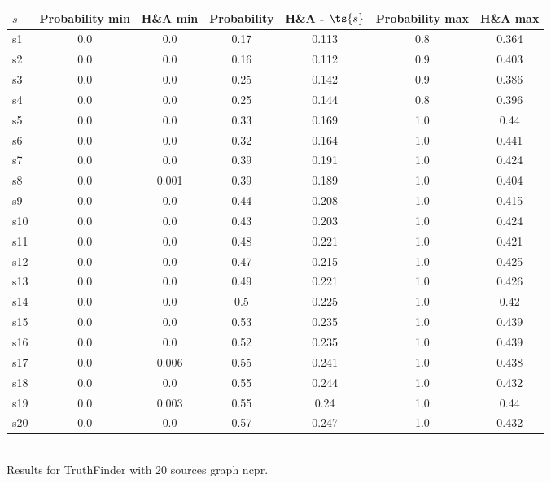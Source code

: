 \documentclass{article}
\begin{document}
\noindent\begin{tabular}{|l|c|c|c|c|c|c|}
\hline
$s$& Probability min & H\&A min & Probability & H\&A - $\ts{s}$ & Probability max & H\&A max\\
\hline
s1 &0.0 & 0.0 & 0.17 & 0.113 & 0.8 & 0.364\\
\hline
s2 &0.0 & 0.0 & 0.16 & 0.112 & 0.9 & 0.403\\
\hline
s3 &0.0 & 0.0 & 0.25 & 0.142 & 0.9 & 0.386\\
\hline
s4 &0.0 & 0.0 & 0.25 & 0.144 & 0.8 & 0.396\\
\hline
s5 &0.0 & 0.0 & 0.33 & 0.169 & 1.0 & 0.44\\
\hline
s6 &0.0 & 0.0 & 0.32 & 0.164 & 1.0 & 0.441\\
\hline
s7 &0.0 & 0.0 & 0.39 & 0.191 & 1.0 & 0.424\\
\hline
s8 &0.0 & 0.001 & 0.39 & 0.189 & 1.0 & 0.404\\
\hline
s9 &0.0 & 0.0 & 0.44 & 0.208 & 1.0 & 0.415\\
\hline
s10 &0.0 & 0.0 & 0.43 & 0.203 & 1.0 & 0.424\\
\hline
s11 &0.0 & 0.0 & 0.48 & 0.221 & 1.0 & 0.421\\
\hline
s12 &0.0 & 0.0 & 0.47 & 0.215 & 1.0 & 0.425\\
\hline
s13 &0.0 & 0.0 & 0.49 & 0.221 & 1.0 & 0.426\\
\hline
s14 &0.0 & 0.0 & 0.5 & 0.225 & 1.0 & 0.42\\
\hline
s15 &0.0 & 0.0 & 0.53 & 0.235 & 1.0 & 0.439\\
\hline
s16 &0.0 & 0.0 & 0.52 & 0.235 & 1.0 & 0.439\\
\hline
s17 &0.0 & 0.006 & 0.55 & 0.241 & 1.0 & 0.438\\
\hline
s18 &0.0 & 0.0 & 0.55 & 0.244 & 1.0 & 0.432\\
\hline
s19 &0.0 & 0.003 & 0.55 & 0.24 & 1.0 & 0.44\\
\hline
s20 &0.0 & 0.0 & 0.57 & 0.247 & 1.0 & 0.432\\
\hline
\end{tabular}\\

\noindent Results for TruthFinder with 20 sources graph ncpr.
\end{document}
